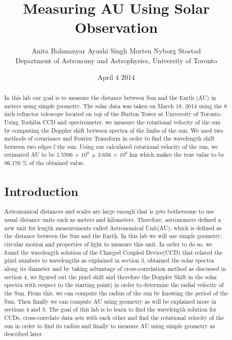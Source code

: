 \documentclass[letterpaper,12pt]{article}
\title{Measuring AU Using Solar Observation}
\author{Anita Bahmanyar \qquad Ayushi Singh \qquad Morten Nyborg Stostad \\Department of Astronomy and Astrophysics, University of Toronto}
\affil{\small {Written by: Anita Bahmanyar}}
\affil{\small {anita.bahmanyar@mail.utoronto.ca}}
\affil{\small {Student Number: 998909098}}
\date{April 4 2014}
\begin{document}
\maketitle

\begin{abstract}
\label{abstract}
In this lab our goal is to measure the distance between Sun and the Earth (AU) in meters using simple geometry. The solar data was taken on March 18, 2014 using the 8 inch refractor telescope located on top of the Burton Tower at University of Toronto. Using Toshiba CCD and spectrometer, we measure the rotational velocity of the sun by computing the Doppler shift between spectra of the limbs of the sun. We used two methods of covariance and Fourier Transform in order to find the wavelength shift between two edges f the sun. Using our calculated rotational velocity of the sun, we estimated AU to be 1.5506 $\times$ $10^{8}$ $\pm$ 3.656 $\times$ $10^6$ km which makes the true value to be 96.176 \% of the obtained value.

\section{Introduction}
\label{sec:introduction}
Astronomical distances and scales are large enough that is gets bothersome to use usual distance units such as meters and kilometers. Therefore, astronomers defined a new unit for length measurements called Astronomical Unit(AU), which is defined as the distance between the Sun and the Earth. In this lab we will use simple geometry, circular motion and properties of light to measure this unit. In order to do so, we found the wavelength solution of the Charged Coupled Device(CCD) that related the pixel numbers to wavelengths as explained in section 3, obtained the solar spectra along its diameter and by taking advantage of cross-correlation method as discussed in section 4, we figured out the pixel shift and therefore the Doppler Shift in the solar spectra with respect to the starting point( in order to determine the radial velocity of the Sun. From this, we can compute the radius of the sun by knowing the period of the Sun. Then finally we can compute AU using geometry as will be explained more in sections 4 and 5. The goal of this lab is to learn to find the wavelength solution for CCDs, cross-correlate data sets with each other and find the rotational velocity of the sun in order to find its radius and finally to measure AU using simple geometry as described later.



\end{abstract}
\end{document}
